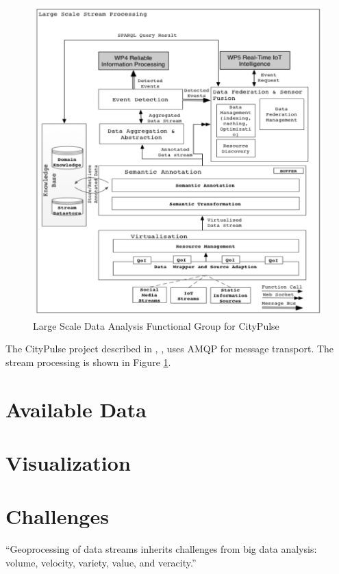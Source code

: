 \documentclass[]{scrartcl}
\begin{document}
\begin{figure}[h]
	\centering
	\includegraphics[width=\textwidth]{Tsiatsis_2015}
	\caption{Large Scale Data Analysis Functional Group for CityPulse~\cite[p.~25]{Tsiatsis.2015}}
	\label{fig:citypulse-streaming}
\end{figure}

The CityPulse project described in \cite{Tsiatsis.2015}, \cite{Presser.2016}, \cite{Puiu.2016} \cite{Puiu.2016b} uses AMQP for message transport. The stream processing is shown in Figure \ref{fig:citypulse-streaming}.

\section{Available Data}

\section{Visualization}

\section{Challenges}
\enquote{Geoprocessing of data streams inherits challenges from big data analysis: volume, velocity, variety, value, and veracity.}~\cite[p.~1]{Morales.2015}
\end{document}
